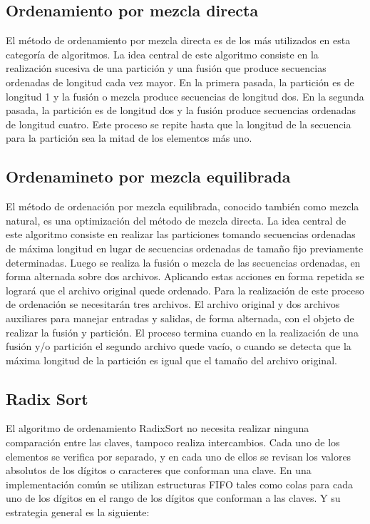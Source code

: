 \documentclass[11pt]{article}
\begin{document}
\subsection{Ordenamiento por mezcla directa}
\par
El método de ordenamiento por mezcla directa es de los más utilizados en esta categoría de algoritmos. La idea central de este algoritmo consiste en la realización sucesiva de una partición y una fusión que produce secuencias ordenadas de longitud cada vez mayor. En la primera pasada, la partición es de longitud 1 y la fusión o mezcla produce secuencias de longitud dos. En la segunda pasada, la partición es de longitud dos y la fusión produce secuencias ordenadas de longitud cuatro. Este proceso se repite hasta que la longitud de la secuencia para la partición sea la mitad de los elementos más uno.

\subsection{Ordenamineto por mezcla equilibrada}
\par
El método de ordenación por mezcla equilibrada, conocido también como mezcla natural, es una optimización del método de mezcla directa. La idea central de este algoritmo consiste en realizar las particiones tomando secuencias ordenadas de máxima longitud en lugar de secuencias ordenadas de tamaño fijo previamente determinadas. Luego se realiza la fusión o mezcla de las secuencias ordenadas, en forma alternada sobre dos archivos. Aplicando estas acciones en forma repetida se logrará que el archivo original quede ordenado. Para la realización de este proceso de ordenación se necesitarán tres archivos. El archivo original y dos archivos auxiliares para manejar entradas y salidas, de forma alternada, con el objeto de realizar la fusión y partición. El proceso termina cuando en la realización de una fusión y/o partición el segundo archivo quede vacío, o cuando se detecta que la máxima longitud de la partición es igual que el tamaño del archivo original.

\subsection{Radix Sort}
\par
El algoritmo de ordenamiento RadixSort no necesita realizar ninguna comparación entre las claves, tampoco realiza intercambios. Cada uno de los elementos se verifica por separado, y en cada uno de ellos se revisan los valores absolutos de los dígitos o caracteres que conforman una clave. En una implementación común se utilizan estructuras FIFO tales como colas para cada uno de los dígitos en el rango de los dígitos que conforman a las claves. Y su estrategia general es la siguiente:
\end{document}
